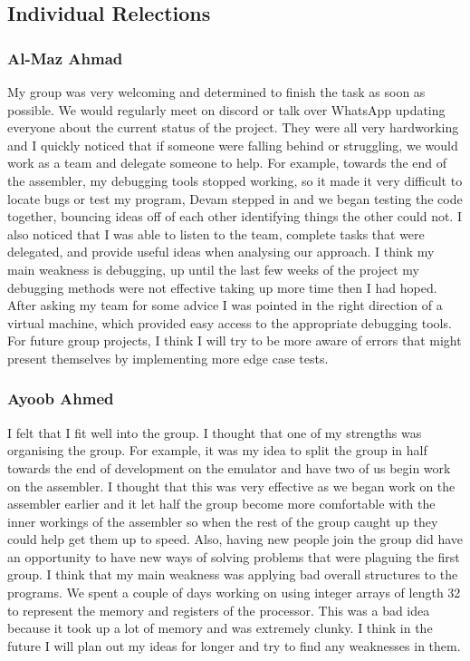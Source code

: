 \documentclass[10pt]{article}
\begin{document}
\subsection{Individual Relections}
\subsubsection{Al-Maz Ahmad}
My group was very welcoming and determined to finish the task as soon as possible. We would regularly meet on discord or talk over WhatsApp updating everyone about the current status of the project. They were all very hardworking and I quickly noticed that if someone were falling behind or struggling, we would work as a team and delegate someone to help. For example, towards the end of the assembler, my debugging tools stopped working, so it made it very difficult to locate bugs or test my program, Devam stepped in and we began testing the code together, bouncing ideas off of each other identifying things the other could not. I also noticed that I was able to listen to the team, complete tasks that were delegated, and provide useful ideas when analysing our approach. I think my main weakness is debugging, up until the last few weeks of the project my debugging methods were not effective taking up more time then I had hoped. After asking my team for some advice I was pointed in the right direction of a virtual machine, which provided easy access to the appropriate debugging tools. For future group projects, I think I will try to be more aware of errors that might present themselves by implementing more edge case tests.
\subsubsection{Ayoob Ahmed}
I felt that I fit well into the group. I thought that one of my strengths was organising the group. For example, it was my idea to split the group in half towards the end of development on the emulator and have two of us begin work on the assembler. I thought that this was very effective as we began work on the assembler earlier and it let half the group become more comfortable with the inner workings of the assembler so when the rest of the group caught up they could help get them up to speed. Also, having new people join the group did have an opportunity to have new ways of solving problems that were plaguing the first group. I think that my main weakness was applying bad overall structures to the programs. We spent a couple of days working on using integer arrays of length 32 to represent the memory and registers of the processor. This was a bad idea because it took up a lot of memory and was extremely clunky. I think in the future I will plan out my ideas for longer and try to find any weaknesses in them.
\end{document}
